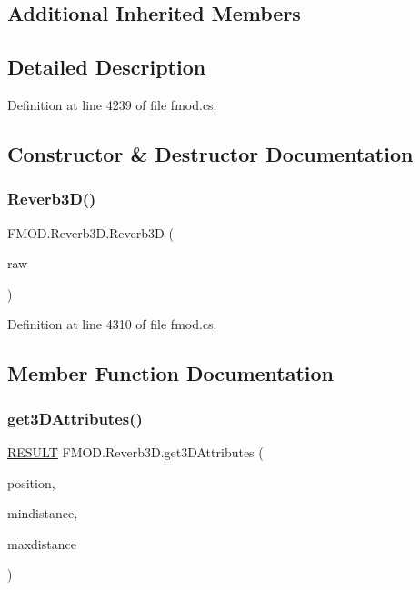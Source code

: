 \subsection*{Additional Inherited Members}


\subsection{Detailed Description}


Definition at line 4239 of file fmod.\+cs.



\subsection{Constructor \& Destructor Documentation}
\mbox{\label{class_f_m_o_d_1_1_reverb3_d_a3fbd6427e524893190c9cea3c5cddcaf}} 
\subsubsection{\texorpdfstring{Reverb3\+D()}{Reverb3D()}}
{\footnotesize\ttfamily F\+M\+O\+D.\+Reverb3\+D.\+Reverb3D (\begin{DoxyParamCaption}\item[{Int\+Ptr}]{raw }\end{DoxyParamCaption})}



Definition at line 4310 of file fmod.\+cs.



\subsection{Member Function Documentation}
\mbox{\label{class_f_m_o_d_1_1_reverb3_d_a6d8250616062ae21af248c92eece725b}} 
\subsubsection{\texorpdfstring{get3\+D\+Attributes()}{get3DAttributes()}}
{\footnotesize\ttfamily \hyperlink{namespace_f_m_o_d_a305d1176ef3f8c8815861a60407ac33d}{R\+E\+S\+U\+LT} F\+M\+O\+D.\+Reverb3\+D.\+get3\+D\+Attributes (\begin{DoxyParamCaption}\item[{ref \hyperlink{struct_f_m_o_d_1_1_v_e_c_t_o_r}{V\+E\+C\+T\+OR}}]{position,  }\item[{ref float}]{mindistance,  }\item[{ref float}]{maxdistance }\end{DoxyParamCaption})}



